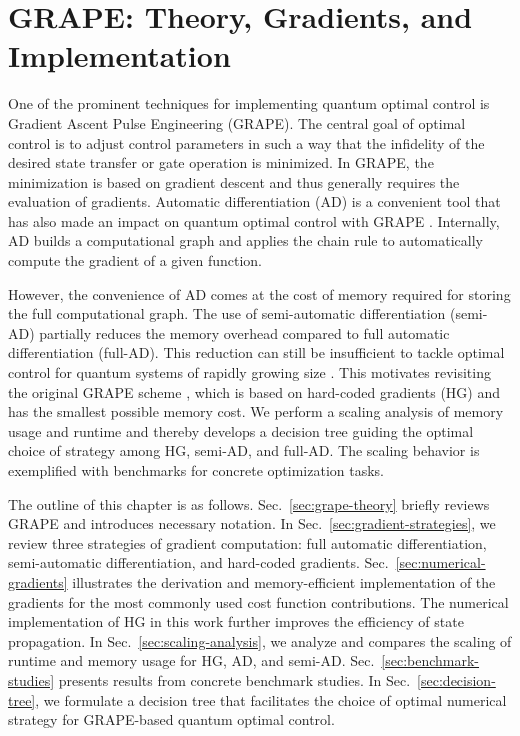 \chapter{GRAPE: Theory, Gradients, and Implementation}
\label{chap:grape}

One of the prominent techniques for implementing quantum optimal control is Gradient Ascent Pulse Engineering (GRAPE). The central goal of optimal control is to adjust control parameters in such a way that the infidelity of the desired state transfer or gate operation is minimized. In GRAPE, the minimization is based on gradient descent and thus generally requires the evaluation of gradients. Automatic differentiation (AD) \cite{baydin2018automatic} is a convenient tool that has also made an impact on quantum optimal control with GRAPE \cite{pacleung2017speedup,pacqoc,abdelhafez2019gradient,grapead}.
Internally, AD builds a computational graph and applies the chain rule to automatically compute the gradient of a given function. 

However, the convenience of AD comes at the cost of memory required for storing the full computational graph. The use of semi-automatic differentiation (semi-AD) \cite{semiadgoerz2022quantum} partially reduces the memory overhead compared to full automatic differentiation (full-AD). This reduction can still be insufficient to tackle optimal control for quantum systems of rapidly growing size \cite{arute2019quantum,gong2021quantum}. This motivates revisiting the original GRAPE scheme \cite{Khaneja2005}, which is based on hard-coded gradients (HG) and has the smallest possible memory cost. We perform a scaling analysis of memory usage and runtime and thereby develops a decision tree guiding the optimal choice of strategy among HG, semi-AD, and full-AD. The scaling behavior is exemplified with benchmarks for concrete optimization tasks.

The outline of this chapter is as follows. Sec.\ \ref{sec:grape-theory} briefly reviews GRAPE and introduces necessary notation. In Sec.\ \ref{sec:gradient-strategies}, we review three strategies of gradient computation: full automatic differentiation, semi-automatic differentiation, and hard-coded gradients. Sec.\ \ref{sec:numerical-gradients} illustrates the derivation and memory-efficient implementation of the gradients for the most commonly used cost function contributions. The numerical implementation of HG in this work further improves the efficiency of state propagation. In Sec.\ \ref{sec:scaling-analysis}, we analyze and compares the scaling of runtime and memory usage for HG, AD, and semi-AD. Sec.\ \ref{sec:benchmark-studies} presents results from concrete benchmark studies. In Sec.\ \ref{sec:decision-tree}, we formulate a decision tree that facilitates the choice of optimal numerical strategy for GRAPE-based quantum optimal control. 
